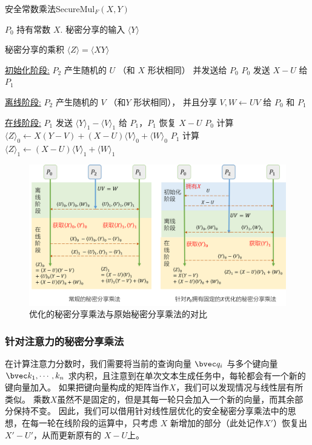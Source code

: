 \begin{algorithm}[h!]
    \caption{安全常数乘法\textsf{SecureMul}$_F(X, Y)$}
    \label{alg:perm-llm:secure_mul_fixed}
    \begin{algorithmic}[1]
    \Require $P_0$ 持有常数 $X$. 秘密分享的输入 $\langle Y \rangle$
    
    \Ensure 秘密分享的乘积 $\langle Z \rangle = \langle XY \rangle$
    
    \item[\underline{初始化阶段:}]
    \State $P_2$ 产生随机的 $U$ （和 $X$ 形状相同） 并发送给 $P_0$
    \State $P_0$ 发送 $X - U$ 给 $P_1$
    
    \item[\underline{离线阶段:}]
    \State $P_2$ 产生随机的 $V$ （和$Y$ 形状相同）， 并且分享 $V, W \gets UV$ 给 $P_0$ 和 $P_1$
    
    \item[\underline{在线阶段:}]
    \State $P_1$ 发送 $\langle Y \rangle_1 - \langle V \rangle_1$ 给 $P_1$，$P_1$ 恢复 $X - U$
    \State $P_0$ 计算 $\langle Z \rangle_0 \gets X(Y-V) + (X-U)\langle V \rangle_0 + \langle W \rangle_0$
    \State $P_1$ 计算 $\langle Z \rangle_1 \gets (X-U) \langle V \rangle_1 + \langle W \rangle_1$
    \end{algorithmic}
\end{algorithm}


\begin{figure}[h!]
    \centering
    \includegraphics[width=\linewidth]{Z_Resources/perm-llm_ssmul.png}    
    \caption{优化的秘密分享乘法与原始秘密分享乘法的对比}
    \label{fig:perm-llm:ssmul}
\end{figure}


\subsubsection{针对注意力的秘密分享乘法}
在计算注意力分数时，我们需要将当前的查询向量 $\bvec q_i$ 与多个键向量 $\bvec k_1, \cdots, k_n$ 求内积，且注意到在单次文本生成任务中，每轮都会有一个新的键向量加入。
%
如果把键向量构成的矩阵当作$X$，我们可以发现情况与线性层有所类似。
乘数$X$虽然不是固定的，但是其每一轮只会加入一个新的向量，而其余部分保持不变。
%
因此，我们可以借用针对线性层优化的安全秘密分享乘法中的思想，在每一轮在线阶段的运算中，只考虑 $X$ 新增加的部分（此处记作$X'$）恢复出 $X' - U'$，从而更新原有的 $X - U$上。
%